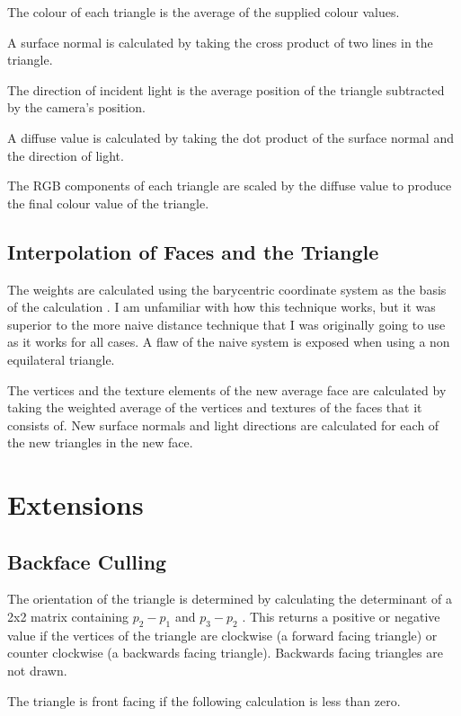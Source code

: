 \documentclass{article}
\begin{document}
The colour of each triangle is the average of the supplied colour values. 

A surface normal is calculated by taking the cross product of two lines in the triangle.

The direction of incident light is the average position of the triangle subtracted by the camera's position.

A diffuse value is calculated by taking the dot product of the surface normal and the direction of light.

The RGB components of each triangle are scaled by the diffuse value to produce the final colour value of the triangle.

\subsection{Interpolation of Faces and the Triangle}

The weights are calculated using the barycentric coordinate system as the basis of the calculation \cite{interpolation}. I am unfamiliar with how this technique works, but it was superior to the more naive distance technique that I was originally going to use as it works for all cases. A flaw of the naive system is exposed when using a non equilateral triangle. 

The vertices and the texture elements of the new average face are calculated by taking the weighted average of the vertices and textures of the faces that it consists of. New surface normals and light directions are calculated for each of the new triangles in the new face. 

\section{Extensions}

\subsection{Backface Culling}

The orientation of the triangle is determined by calculating the determinant of a 2x2 matrix containing $p_2 - p_1$ and $p_3 - p_2$ \cite{orientation}. This returns a positive or negative value if the vertices of the triangle are clockwise (a forward facing triangle) or counter clockwise (a backwards facing triangle). Backwards facing triangles are not drawn.

The triangle is front facing if the following calculation is less than zero.
\end{document}
